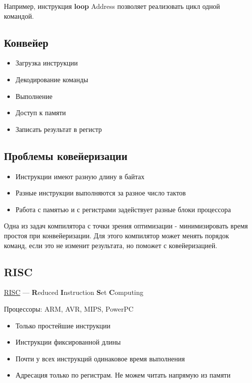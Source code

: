 Например, инструкция \textbf{loop} Address позволяет реализовать цикл одной командой.

\subsection{Конвейер}

\begin{itemize}
	\item Загрузка инструкции
	\item Декодирование команды
	\item Выполнение
	\item Доступ к памяти
	\item Записать результат в регистр
\end{itemize}

\subsection{Проблемы ковейеризации}

\begin{itemize}
	\item Инструкции имеют разную длину в байтах
	\item Разные инструкции выполняются за разное число тактов
	\item Работа с памятью и с регистрами задействует разные блоки процессора
\end{itemize}

Одна из задач компилятора с точки зрения оптимизации - минимизировать время простоя при конвейеризации. Для этого компилятор может менять порядок команд, если это не изменит результата, но поможет с ковейеризацией.

\subsection{RISC}

\begin{Def}
	\underline{RISC} --- \textbf{R}educed \textbf{I}nstruction \textbf{S}et \textbf{C}omputing
\end{Def}

Процессоры: ARM, AVR, MIPS, PowerPC

\begin{itemize}
	\item Только простейшие инструкции
	\item Инструкции фиксированной длины
	\item Почти у всех инструкций одинаковое время выполнения
	\item Адресация только по регистрам. Не можем читать напрямую из памяти
\end{itemize}

